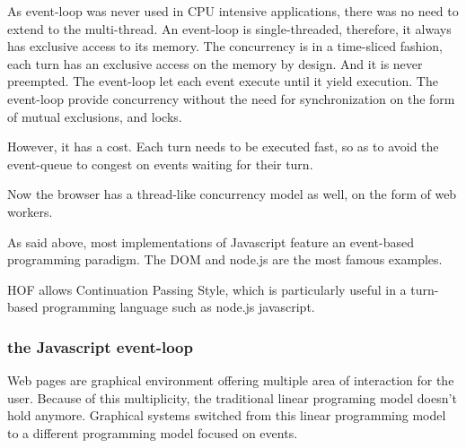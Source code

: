As event-loop was never used in CPU intensive applications, there was no need to extend to the multi-thread.
An event-loop is single-threaded, therefore, it always has exclusive access to its memory.
The concurrency is in a time-sliced fashion, each turn has an exclusive access on the memory by design.
And it is never preempted.
The event-loop let each event execute until it yield execution.
The event-loop provide concurrency without the need for synchronization on the form of mutual exclusions, and locks.

However, it has a cost.
Each turn needs to be executed fast, so as to avoid the event-queue to congest on events waiting for their turn.




Now the browser has a thread-like concurrency model as well, on the form of web workers.


As said above, most implementations of Javascript feature an event-based programming paradigm.
The DOM and node.js are the most famous examples.


HOF allows Continuation Passing Style, which is particularly useful in a turn-based programming language such as node.js javascript.



\subsubsection{the Javascript event-loop}

Web pages are graphical environment offering multiple area of interaction for the user.
Because of this multiplicity, the traditional linear programing model doesn't hold anymore.
Graphical systems switched from this linear programming model to a different programming model focused on events.

